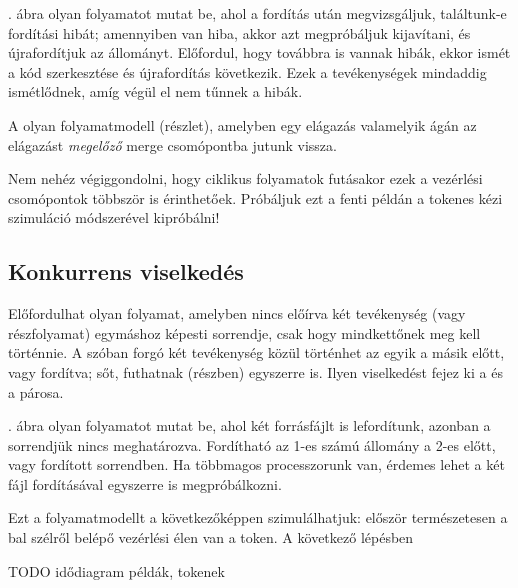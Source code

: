 \begin{pelda}
. ábra olyan folyamatot mutat be, ahol a fordítás után megvizsgáljuk, találtunk-e fordítási hibát; amennyiben van hiba, akkor azt megpróbáljuk kijavítani, és újrafordítjuk az állományt. Előfordul, hogy továbbra is vannak hibák, ekkor ismét a kód szerkesztése és újrafordítás következik. Ezek a tevékenységek mindaddig ismétlődnek, amíg végül el nem tűnnek a hibák.
\end{pelda}


\begin{definicio}
	A  olyan folyamatmodell (részlet), amelyben egy elágazás valamelyik ágán az elágazást \emph{megelőző} merge csomópontba jutunk vissza.
\end{definicio} 
Nem nehéz végiggondolni, hogy ciklikus folyamatok futásakor ezek a vezérlési csomópontok többször is érinthetőek. Próbáljuk ezt a fenti példán a tokenes kézi szimuláció módszerével kipróbálni!

\subsection{Konkurrens viselkedés}
Előfordulhat olyan folyamat, amelyben nincs előírva két tevékenység (vagy részfolyamat) egymáshoz képesti sorrendje, csak hogy mindkettőnek meg kell történnie. A szóban forgó két tevékenység közül történhet az egyik a másik előtt, vagy fordítva; sőt, futhatnak (részben) egyszerre is. Ilyen viselkedést fejez ki a  és a  párosa.

\begin{pelda}
. ábra olyan folyamatot mutat be, ahol két forrásfájlt is lefordítunk, azonban a sorrendjük nincs meghatározva. Fordítható az 1-es számú állomány a 2-es előtt, vagy fordított sorrendben. Ha többmagos processzorunk van, érdemes lehet a két fájl fordításával egyszerre is megpróbálkozni.

Ezt a folyamatmodellt a következőképpen szimulálhatjuk: először természetesen a bal szélről belépő vezérlési élen van a token. A következő lépésben 
\end{pelda}


TODO idődiagram példák, tokenek

